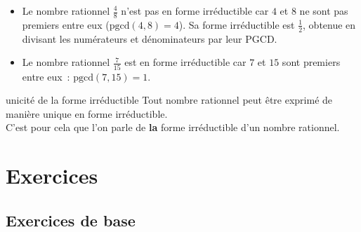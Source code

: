 \begin{enumeratebf}
\begin{exemple}{}{}
    \begin{itemize}
        \item Le nombre rationnel \(\frac{4}{8}\) n'est pas en forme irréductible car \(4\) et \(8\) ne sont pas premiers entre eux (\(\text{pgcd}(4, 8) = 4\)). Sa forme irréductible est \(\frac{1}{2}\), obtenue en divisant les numérateurs et dénominateurs par leur PGCD.
        \item Le nombre rationnel \(\frac{7}{15}\) est en forme irréductible car \(7\) et \(15\) sont premiers entre eux~: \(\text{pgcd}(7, 15) = 1\).
    \end{itemize}
\end{exemple}

\begin{theoreme}{}{unicité de la forme irréductible}
    Tout nombre rationnel peut être exprimé de manière unique en forme irréductible.\\
    C'est pour cela que l'on parle de \textbf{la} forme irréductible d'un nombre rationnel.
\end{theoreme}

\section{Exercices}
\subsection{Exercices de base}


\end{enumeratebf}
